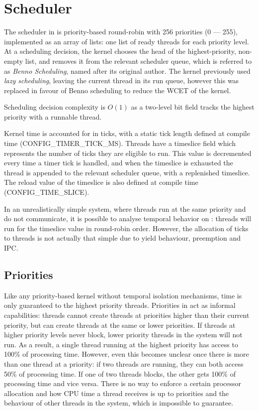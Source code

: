\section{Scheduler}

The scheduler in \selfour is priority-based round-robin with 256 priorities (0 --- 255), implemented as an array of lists: one list of ready threads for each priority level. 
At a scheduling decision, the kernel chooses the head of the highest-priority, non-empty list, and
removes it from the relevant scheduler queue, which is referred to as \emph{Benno Scheduling}, named
after its original author.
The kernel previously used \emph{lazy scheduling}, leaving the current thread in its run queue, however this was replaced in favour of Benno scheduling to reduce the WCET of the kernel. 

Scheduling decision complexity is $O(1)$ as a two-level bit field tracks the highest priority with a runnable thread.

Kernel time is accounted for in ticks, with a static tick length defined at compile time (CONFIG\_TIMER\_TICK\_MS).
Threads have a timeslice field which represents the number of ticks they are eligible to run. 
This value is decremented every time a timer tick is handled, and when the timeslice is exhausted the thread is appended to the relevant scheduler queue, with a replenished timeslice.
The reload value of the timeslice is also defined at compile time (CONFIG\_TIME\_SLICE).

In an unrealistically simple system, where threads run at the same priority and do not communicate, it is possible to analyse temporal behavior on \selfour: threads will run for the timeslice value in round-robin order.
However, the allocation of ticks to threads is not actually that simple due to yield behaviour, preemption and \gls{IPC}. 

\subsection{Priorities}

Like any priority-based kernel without temporal isolation mechanisms, time is only guaranteed to the highest priority threads.
Priorities in \selfour act as informal capabilities: threads cannot create threads at priorities higher than their current priority, but can create threads at the same or lower priorities.
If threads at higher priority levels never block, lower priority threads in the system will not run.
As a result, a single thread running at the highest priority has access to 100\% of processing time.
However, even this becomes unclear once there is more than one thread at a priority: if two threads are running, they can both access 50\% of processing time.
If one of two threads blocks, the other gets 100\% of processing time and vice versa.
There is no way to enforce a certain processor allocation and how CPU time a thread receives is up
to priorities and the behaviour of other threads in the system, which is impossible to guarantee.

